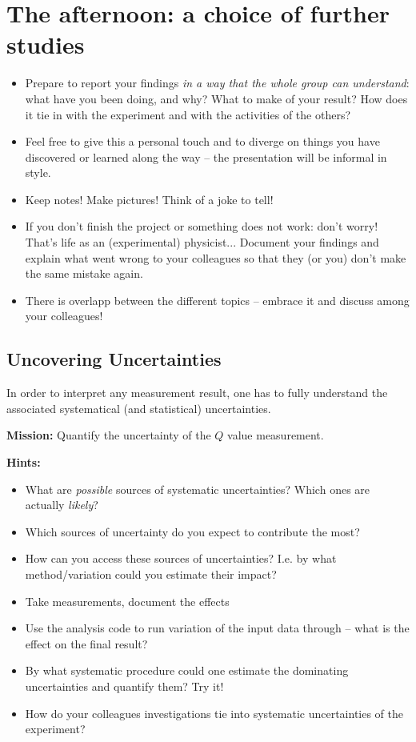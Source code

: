 \documentclass[a4,11pt, notitlepage]{article}
\begin{document}
\section{The afternoon: a choice of further studies}
\label{sec:afternoon}

\begin{itemize}
\item Prepare to report your findings \emph{in a way that the
    whole group can understand}: what have you been doing, and why?
  What to make of your result? How does it tie in with the experiment
  and with the activities of the others?
\item Feel free to give this a personal touch and to diverge on things
  you have discovered or learned along the way -- the presentation
  will be informal in style.
\item Keep notes! Make pictures! Think of a joke to tell!
\item If you don't finish the project or something does not work:
  don't worry! That's life as an (experimental) physicist... Document
  your findings and explain what went wrong to your colleagues so that
  they (or you) don't make the same mistake again.
\item There is overlapp between the different topics -- embrace it and
  discuss among your colleagues!
\end{itemize}

\subsection{Uncovering Uncertainties}
\label{sec:uncertainties}

In order to interpret any measurement result, one has to fully
understand the associated systematical (and statistical)
uncertainties.

\noindent\textbf{Mission:} Quantify the uncertainty of the $Q$ value measurement.

\noindent\textbf{Hints:}
\begin{itemize}
\item What are \emph{possible} sources of systematic uncertainties?
  Which ones are actually \emph{likely}?
\item Which sources of uncertainty do you expect to contribute the most?
\item How can you access these sources of uncertainties? I.e. by what
  method/variation could you estimate their impact?
\item Take measurements, document the effects
\item Use the analysis code to run variation of the input data through
  -- what is the effect on the final result?
\item By what systematic procedure could one estimate the dominating
  uncertainties and quantify them? Try it!
\item How do your colleagues investigations tie into systematic
  uncertainties of the experiment?
\end{itemize}
\end{document}

